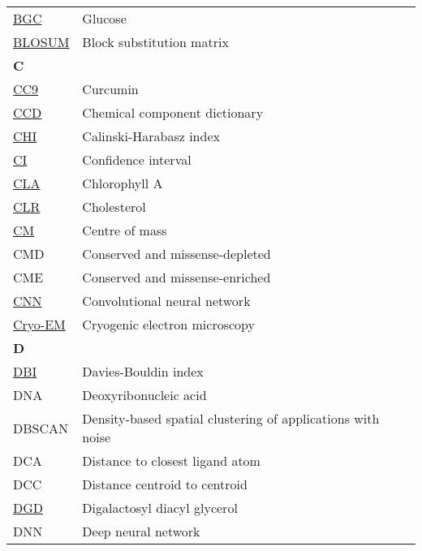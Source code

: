 \begin{longtable}[l]{@{}p{2.5cm}p{12cm}@{}}
\textmd{\href{https://www.ebi.ac.uk/pdbe-srv/pdbechem/chemicalCompound/show/BGC}{BGC}} & Glucose \\
\textmd{\href{https://en.wikipedia.org/wiki/BLOSUM}{BLOSUM}} & Block substitution matrix \\[0.3175cm]
\textbf{\large C} & \\[0.25cm]
\textmd{\href{https://www.ebi.ac.uk/pdbe-srv/pdbechem/chemicalCompound/show/CC9}{CC9}} & Curcumin \\
\textmd{\href{https://www.wwpdb.org/data/ccd}{CCD}} & Chemical component dictionary \\
\textmd{\href{https://en.wikipedia.org/wiki/Calinski–Harabasz_index}{CHI}} & Calinski-Harabasz index \\
\textmd{\href{https://en.wikipedia.org/wiki/Confidence_interval}{CI}} & Confidence interval \\
\textmd{\href{https://www.ebi.ac.uk/pdbe-srv/pdbechem/chemicalCompound/show/CLA}{CLA}} & Chlorophyll A \\
\textmd{\href{https://www.ebi.ac.uk/pdbe-srv/pdbechem/chemicalCompound/show/CLR}{CLR}} & Cholesterol \\
\textmd{\href{https://en.wikipedia.org/wiki/Center_of_mass}{CM}} & Centre of mass \\
\textmd{CMD} & Conserved and missense-depleted \\
\textmd{CME} & Conserved and missense-enriched \\
\textmd{\href{https://en.wikipedia.org/wiki/Convolutional_neural_network}{CNN}} & Convolutional neural network \\
\textmd{\href{https://en.wikipedia.org/wiki/Cryogenic_electron_microscopy}{Cryo-EM}} & Cryogenic electron microscopy \\[0.3175cm]
\textbf{\large D} & \\[0.25cm]
\textmd{\href{https://en.wikipedia.org/wiki/Davies–Bouldin_index}{DBI}} & Davies-Bouldin index \\
\textmd{DNA} & Deoxyribonucleic acid \\
\textmd{DBSCAN} & Density-based spatial clustering of applications with noise \\
\textmd{DCA} & Distance to closest ligand atom \\
\textmd{DCC} & Distance centroid to centroid \\
\textmd{\href{https://www.ebi.ac.uk/pdbe-srv/pdbechem/chemicalCompound/show/DGD}{DGD}} & Digalactosyl diacyl glycerol \\
\textmd{DNN} & Deep neural network \\

\end{longtable}
